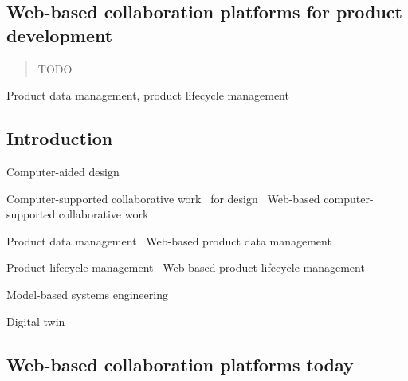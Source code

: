\documentclass[numbers,sort&compress]{IntechOpen-Book}%
\begin{document}
\Mainmatter

\begin{frontmatter}

\chapter{Web-based collaboration platforms for product development}
\author{Georg Hackenberg}
\author{Christian Zehetner}

\makechaptertitle


\begin{abstract} %
TODO
\end{abstract}

\begin{keywords} %
Product data management, product lifecycle management
\end{keywords}


\end{frontmatter}

\section{Introduction} %

Computer-aided design~\cite{Ross_1963}

Computer-supported collaborative work~\cite{Kraemer_1988} for design~\cite{Bokder_1988}
Web-based computer-supported collaborative work~\cite{Bentley_1997}

Product data management~\cite{Philpotts_1996}
Web-based product data management~\cite{TonyLui_2001}

Product lifecycle management~\cite{Grieves_2005}
Web-based product lifecycle management~\cite{Vezzetti_2009}

Model-based systems engineering~\cite{Ogren_2000}

Digital twin~\cite{Grieves_2017}

\section{Web-based collaboration platforms today}
\end{document}
